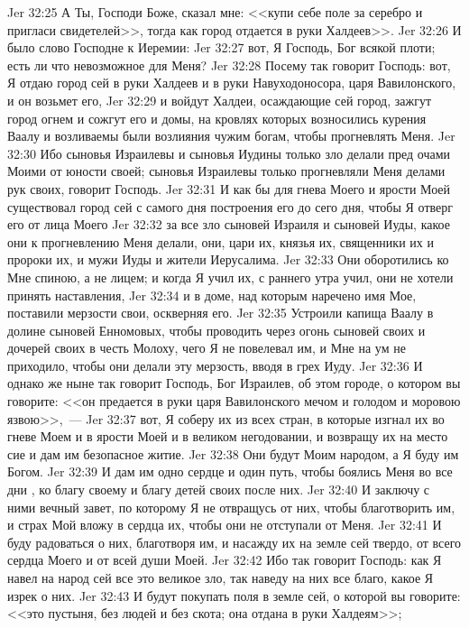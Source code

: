 \vs Jer 32:25 А Ты, Господи Боже, сказал мне: <<купи себе поле за серебро и пригласи свидетелей>>, тогда как город отдается в руки Халдеев>>.
\rsbpar\vs Jer 32:26 И было слово Господне к Иеремии:
\vs Jer 32:27 вот, Я Господь, Бог всякой плоти; есть ли что невозможное для Меня?
\vs Jer 32:28 Посему так говорит Господь: вот, Я отдаю город сей в руки Халдеев и в руки Навуходоносора, царя Вавилонского, и он возьмет его,
\vs Jer 32:29 и войдут Халдеи, осаждающие сей город, зажгут город огнем и сожгут его и домы, на кровлях которых возносились курения Ваалу и возливаемы были возлияния чужим богам, чтобы прогневлять Меня.
\vs Jer 32:30 Ибо сыновья Израилевы и сыновья Иудины только зло делали пред очами Моими от юности своей; сыновья Израилевы только прогневляли Меня делами рук своих, говорит Господь.
\vs Jer 32:31 И как бы для гнева Моего и ярости Моей существовал город сей с самого дня построения его до сего дня, чтобы Я отверг его от лица Моего
\vs Jer 32:32 за все зло сыновей Израиля и сыновей Иуды, какое они к прогневлению Меня делали, они, цари их, князья их, священники их и пророки их, и мужи Иуды и жители Иерусалима.
\vs Jer 32:33 Они оборотились ко Мне спиною, а не лицем; и когда Я учил их, с раннего утра учил, они не хотели принять наставления,
\vs Jer 32:34 и в доме, над которым наречено имя Мое, поставили мерзости свои, оскверняя его.
\vs Jer 32:35 Устроили капища Ваалу в долине сыновей Енномовых, чтобы проводить через огонь сыновей своих и дочерей своих в честь Молоху, чего Я не повелевал им, и Мне на ум не приходило, чтобы они делали эту мерзость, вводя в грех Иуду.
\vs Jer 32:36 И однако же ныне так говорит Господь, Бог Израилев, об этом городе, о котором вы говорите: <<он предается в руки царя Вавилонского мечом и голодом и моровою язвою>>,~---
\vs Jer 32:37 вот, Я соберу их из всех стран, в которые изгнал их во гневе Моем и в ярости Моей и в великом негодовании, и возвращу их на место сие и дам им безопасное житие.
\vs Jer 32:38 Они будут Моим народом, а Я буду им Богом.
\vs Jer 32:39 И дам им одно сердце и один путь, чтобы боялись Меня во все дни , ко благу своему и благу детей своих после них.
\vs Jer 32:40 И заключу с ними вечный завет, по которому Я не отвращусь от них, чтобы благотворить им, и страх Мой вложу в сердца их, чтобы они не отступали от Меня.
\vs Jer 32:41 И буду радоваться о них, благотворя им, и насажду их на земле сей твердо, от всего сердца Моего и от всей души Моей.
\vs Jer 32:42 Ибо так говорит Господь: как Я навел на народ сей все это великое зло, так наведу на них все благо, какое Я изрек о них.
\vs Jer 32:43 И будут покупать поля в земле сей, о которой вы говорите: <<это пустыня, без людей и без скота; она отдана в руки Халдеям>>;
